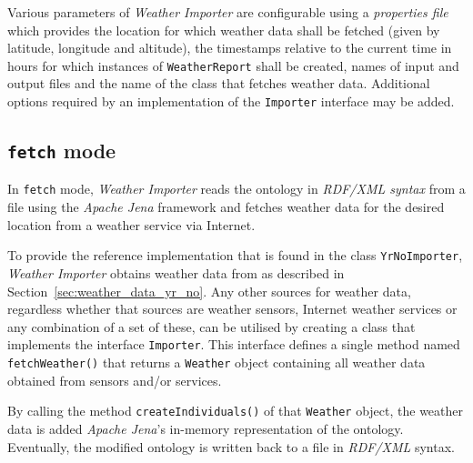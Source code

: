 Various parameters of \emph{Weather Importer} are configurable using a \emph{properties file}~\cite{java_properties} which provides the location for which weather data shall be fetched (given by latitude, longitude and altitude), the timestamps relative to the current time in hours for which instances of \texttt{WeatherReport} shall be created, names of input and output files and the name of the class that fetches weather data. Additional options required by an implementation of the \texttt{Importer} interface may be added.

\subsection{\texttt{fetch} mode}
\label{subsec:importer_fetch}

In \texttt{fetch} mode, \emph{Weather Importer} reads the \smarthomeweather ontology in \emph{RDF/XML syntax} from a file using the \emph{Apache Jena} framework and fetches weather data for the desired location from a weather service via Internet.

To provide the reference implementation that is found in the class \texttt{YrNoImporter}, \emph{Weather Importer} obtains weather data from \yrno as described in Section~\ref{sec:weather_data_yr_no}. Any other sources for weather data, regardless whether that sources are weather sensors, Internet weather services or any combination of a set of these, can be utilised by creating a class that implements the interface \texttt{Importer}. This interface defines a single method named \texttt{fetchWeather()} that returns a \texttt{Weather} object containing all weather data obtained from sensors and/or services.

By calling the method \texttt{createIndividuals()} of that \texttt{Weather} object, the weather data is added \emph{Apache Jena}'s in-memory representation of the ontology. Eventually, the modified ontology is written back to a file in \emph{RDF/XML} syntax.


